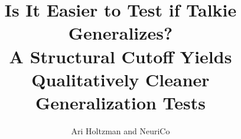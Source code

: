 \documentclass{article}
\title{Is It Easier to Test if Talkie Generalizes? \\
A Structural Cutoff Yields Qualitatively Cleaner Generalization Tests}
\author{Ari Holtzman and NeuriCo}
\begin{document}
\maketitle

\begin{abstract}

\end{abstract}









\end{document}
